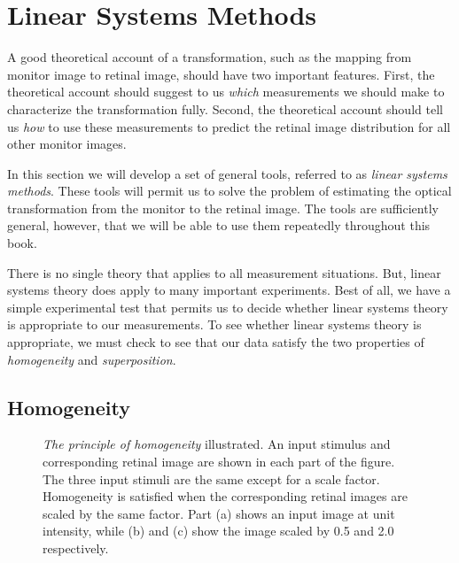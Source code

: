 \section{Linear Systems Methods}
A good theoretical account of a
transformation, such as the mapping from monitor image to retinal image,
should have two important features.
First, the theoretical account should
suggest to us {\em which} measurements we should
make to characterize the transformation fully.
Second, the theoretical account should
tell us {\em how}  to use these measurements
to predict the retinal image distribution for
all other monitor images.

In this section we will develop a set of general
tools, referred to as {\em linear systems methods}.
These tools will permit us to solve the
problem of estimating the optical transformation from the
monitor to the retinal image.
The tools are sufficiently general, however, that we will
be able to use them repeatedly throughout this book.

There is no single theory that
applies to all measurement situations.
But, linear systems theory does apply
to many important experiments.
Best of all,
we have a simple experimental test that permits us to
decide whether linear systems theory is
appropriate to our measurements.
To see whether linear systems theory is appropriate,
we must check to see that our data satisfy the two properties of
{\em homogeneity} and {\em superposition}.

\subsection*{Homogeneity}

\begin{figure}
\centerline {
}
\caption[Homogeneity]{
{\em The principle of homogeneity} illustrated.
An input stimulus and corresponding
retinal image are shown in each part of the figure.
The three input stimuli
are the same except for a scale factor.
Homogeneity is satisfied when the corresponding
retinal images are scaled by the same factor.
Part (a) shows an input image at unit intensity,
while (b) and (c) show the image scaled by 0.5 and 2.0 respectively.
}
\label{f1:homogeneity}
\end{figure}

